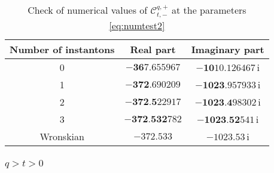 \documentclass[11pt]{article}
\numberwithin{equation}{section}
\begin{document}
\begin{table}[h!]
\centering
    \begin{tabular}{| c | c  c| }
    \hline
     Number of instantons & Real part  & Imaginary part \\

    \hline 

    0  & $-\textbf{36}7.655967$  & $-\textbf{10}10.126467$\,i  \\

    1  & $-\textbf{372}.690209$ &  $-\textbf{1023}.957933$\,i \\

    2  & $-\textbf{372.5}22917$  & $-\textbf{1023.4}98302$\,i \\

    3  & $-\textbf{372.532}782$ & $-\textbf{1023.52}541$\,i \\
         \hline
   Wronskian & $-372.533$ & $-1023.53$\,i \\
         \hline
    \end{tabular}
    \caption{Check of numerical values of $\mathcal{C}_{t,-}^{q,+}$ at the parameters \eqref{eq:numtest2}}
    \label{ttoqnegative2}
\end{table}






\subsubsection{$q>t>0$}\label{connII:qt0g}
\end{document}
